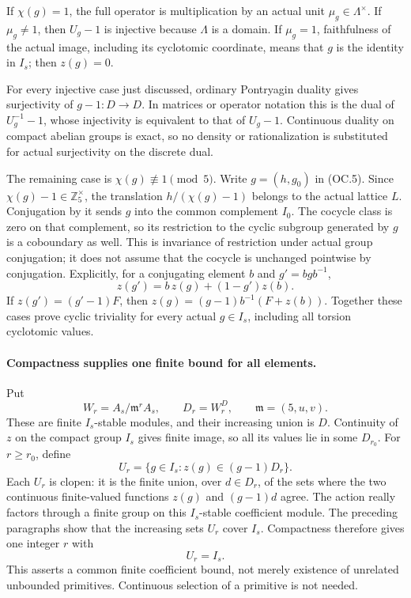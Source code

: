 If \(\chi(g)=1\), the full operator is multiplication by
an actual unit \(\mu_g\in\Lambda^\times\). If
\(\mu_g\ne1\), then \(U_g-1\) is injective because
\(\Lambda\) is a domain. If \(\mu_g=1\), faithfulness
of the actual image, including its cyclotomic coordinate,
means that \(g\) is the identity in \(I_s\); then
\(z(g)=0\).

For every injective case just discussed, ordinary Pontryagin
duality gives surjectivity of \(g-1:D\to D\). In matrices
or operator notation this is the dual of
\(U_g^{-1}-1\), whose injectivity is equivalent to that of
\(U_g-1\). Continuous duality on compact abelian groups is
exact, so no density or rationalization is substituted for
actual surjectivity on the discrete dual.

The remaining case is \(\chi(g)\not\equiv1\pmod5\).
Write \(g=(h,g_0)\) in (OC.5). Since
\(\chi(g)-1\in\mathbb Z_5^\times\), the translation
\(h/(\chi(g)-1)\) belongs to the actual lattice \(L\).
Conjugation by it sends \(g\) into the common complement
\(I_0\). The cocycle class is zero on that complement,
so its restriction to the cyclic subgroup generated by
\(g\) is a coboundary as well. This is invariance of
restriction under actual group conjugation; it does not
assume that the cocycle is unchanged pointwise by conjugation.
Explicitly, for a conjugating element \(b\) and
\(g'=bgb^{-1}\),
\[
 z(g')=b\,z(g)+(1-g')z(b).
\]
If \(z(g')=(g'-1)F\), then
\(z(g)=(g-1)b^{-1}(F+z(b))\).
Together these cases prove cyclic triviality for every actual
\(g\in I_s\), including all torsion cyclotomic values.

\paragraph{Compactness supplies one finite bound for all elements.}
Put
\[
       W_r=A_s/\mathfrak m^r A_s,\qquad
       D_r=W_r^D,\qquad \mathfrak m=(5,u,v).
\]
These are finite \(I_s\)-stable modules, and their increasing
union is \(D\). Continuity of \(z\) on the compact group
\(I_s\) gives finite image, so all its values lie in some
\(D_{r_0}\). For \(r\ge r_0\), define
\[
 U_r=\{g\in I_s:z(g)\in(g-1)D_r\}.                    \tag{OC.7}
\]
Each \(U_r\) is clopen: it is the finite union, over
\(d\in D_r\), of the sets where the two continuous
finite-valued functions \(z(g)\) and \((g-1)d\) agree.
The action really factors through a finite group on this
\(I_s\)-stable coefficient module. The preceding paragraphs
show that the increasing sets \(U_r\) cover \(I_s\).
Compactness therefore gives one integer \(r\) with
\[
                              U_r=I_s.                 \tag{OC.8}
\]
This asserts a common finite coefficient bound, not merely
existence of unrelated unbounded primitives. Continuous
selection of a primitive is not needed.

